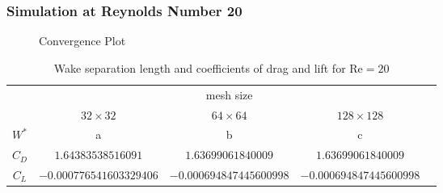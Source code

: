 	\subsubsection{Simulation at Reynolds Number 20}
	\begin{figure}[htp]	
		\centering
		\label{shivfjftersaror}	
		\caption{Convergence Plot}
	\end{figure}
	
		\begin{table}[htp]
			\centering
			\begin{tabular}{|c||c|c|c|c}
				\cline{1-4}
				\rule{0pt}{2,3ex}\multirow{2}{*}{}   & \multicolumn{3}{c|}{mesh size} &  \\ \cline{2-4}
				\rule{0pt}{2,3ex}& $32 \times 32$       & $64 \times 64$       & $128 \times 128$      &  \\ \cline{1-4}
				\rule{0pt}{2,3ex}$W^*$ 				 & a        & b        & c        &  \\ \cline{1-4}
				\rule{0pt}{2,3ex}$C_D$                & $1.64383538516091$        & $1.63699061840009$        & $1.63699061840009$       &  \\ \cline{1-4}
				\rule{0pt}{2,3ex}$C_L$                & $-0.000776541603329406$       & $-0.000694847445600998$       & $-0.000694847445600998$        &  \\ \cline{1-4}
			\end{tabular}
			\caption{Wake separation length and coefficients of drag and lift for $\text{Re}=20$}
			\label{tab:re20}
		\end{table}
